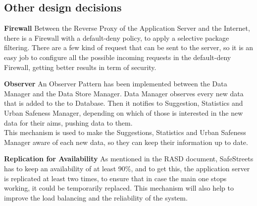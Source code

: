 \subsection{Other design decisions}
\textbf{Firewall}\newline
Between the Reverse Proxy of the Application Server and the Internet, there is a Firewall with a default-deny policy, to apply a selective package filtering. There are a few kind of request that can be sent to the server, so it is an easy job to configure all the possible incoming requests in the default-deny Firewall, getting better results in term of security.\newline 

\noindent \textbf{Observer}\newline
An Observer Pattern has been implemented between the Data Manager and the Data Store Manager. Data Manager observes every new data that is added to the to Database. Then it notifies to Suggestion, Statistics and Urban Safeness Manager, depending on which of those is interested in the new data for their aims, pushing data to them.\\
This mechanism is used to make the Suggestions, Statistics and Urban Safeness Manager aware of each new data, so they can keep their information up to date.\newline

\noindent \textbf{Replication for Availability}
As mentioned in the RASD document, SafeStreets has to keep an availability of at least 90\%, and to get this, the application server is replicated at least two times, to ensure that in case the main one stops working, it could be temporarily replaced. This mechanism will also help to improve the load balancing and the reliability of the system.